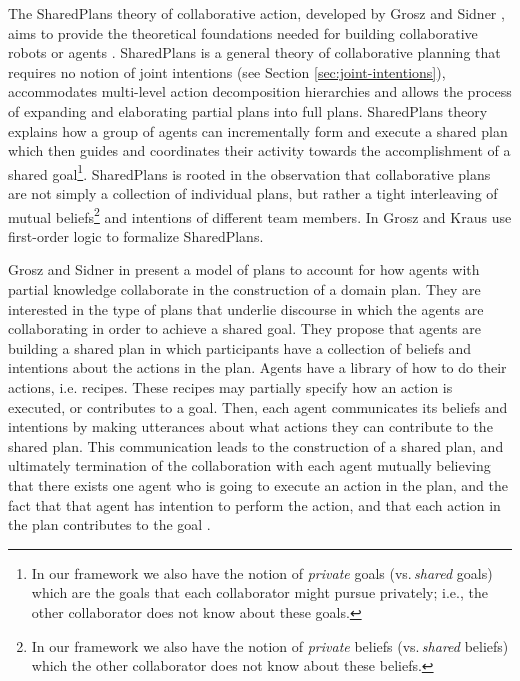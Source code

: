 \documentclass[12pt]{report}
\begin{document}
The SharedPlans theory of collaborative action, developed by Grosz and Sidner
\cite{grosz:planning-acting, grosz:collaboration, grosz:plans-discourse}, aims
to provide the theoretical foundations needed for building collaborative
robots or agents \cite{grosz:collaborative-systems}. SharedPlans is a general
theory of collaborative planning that requires no notion of joint intentions
(see Section \ref{sec:joint-intentions}), accommodates multi-level action
decomposition hierarchies and allows the process of expanding and elaborating
partial plans into full plans. SharedPlans theory explains how a group of agents
can incrementally form and execute a shared plan which then guides and
coordinates their activity towards the accomplishment of a shared
goal\footnote{\color{red}In our framework we also have the notion of
\textit{private} goals (vs.\,\textit{shared} goals) which are the goals that
each collaborator might pursue privately; i.e., the other collaborator does not
know about these goals.}. SharedPlans is rooted in the observation that
collaborative plans are not simply a collection of individual plans, but rather
a tight interleaving of mutual beliefs\footnote{\color{red}In our framework we
also have the notion of \textit{private} beliefs (vs.\,\textit{shared} beliefs)
which the other collaborator does not know about these beliefs.} and intentions
of different team members. In \cite{grosz:collaboration} Grosz and Kraus use
first-order logic to formalize SharedPlans.

Grosz and Sidner in \cite{grosz:plans-discourse} present a model of plans to
account for how agents with partial knowledge collaborate in the construction of
a domain plan. They are interested in the type of plans that underlie discourse
in which the agents are collaborating in order to achieve a shared goal. They
propose that agents are building a shared plan in which participants have a
collection of beliefs and intentions about the actions in the plan. Agents have
a library of how to do their actions, i.e. recipes. These recipes may partially
specify how an action is executed, or contributes to a goal. Then, each agent
communicates its beliefs and intentions by making utterances about what actions
they can contribute to the shared plan. This communication leads to the
construction of a shared plan, and ultimately termination of the collaboration
with each agent mutually believing that there exists one agent who is going to
execute an action in the plan, and the fact that that agent has intention to
perform the action, and that each action in the plan contributes to the goal
\cite{grosz:plans-discourse} \cite{lochbaum:plan-models}.
\end{document}
